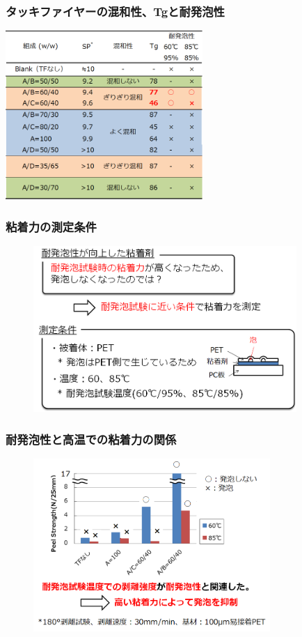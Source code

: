 \documentclass[unicode,12pt]{beamer}%
\begin{document}
\begin{frame}
	\frametitle{タッキファイヤーの混和性、Tgと耐発泡性}
		\centering
			\includegraphics[width=75mm]{TF_table.png}
\end{frame}

\begin{frame}\frametitle{粘着力の測定条件}
	\begin{figure}
		\begin{center}
			\includegraphics[width=100mm]{adh_1.png}
		\end{center}
	\end{figure}
\end{frame}

%
\begin{frame}\frametitle{耐発泡性と高温での粘着力の関係}
	\begin{figure}
		\begin{center}
			\includegraphics[width=90mm]{adh_2.png}
		\end{center}
	\end{figure}
\end{frame}
\end{document}
